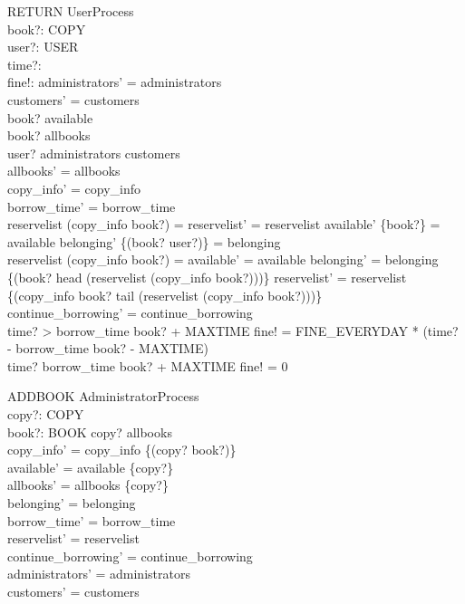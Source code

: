 \begin{schema}{RETURN}
  UserProcess\\
  book?: COPY\\
  user?: USER\\
  time?: \nat \\
  fine!: \nat 
\where
  administrators' = administrators\\
  customers' = customers\\
  book? \notin  available\\
  book? \in  allbooks\\
  user? \in  administrators \cup  customers\\
  allbooks' = allbooks\\
  copy\_info' = copy\_info\\
  borrow\_time' = borrow\_time\\
  reservelist (copy\_info book?) = \langle \rangle  \implies  reservelist' = reservelist \land  available' \cup  \{book?\} = available \land  belonging' \cup  \{(book? \mapsto  user?)\} = belonging\\
  \lnot  reservelist (copy\_info book?) = \langle \rangle  \implies  available' = available \land  belonging' = belonging \oplus  \{(book? \mapsto  head (reservelist (copy\_info book?)))\} \land  reservelist' = reservelist \oplus  \{(copy\_info book? \mapsto  tail (reservelist (copy\_info book?)))\}\\
  continue\_borrowing' = continue\_borrowing\\
  time? > borrow\_time book? + MAXTIME \implies  fine! = FINE\_EVERYDAY * (time? - borrow\_time book? - MAXTIME)\\
  time? \leq  borrow\_time book? + MAXTIME \implies  fine! = 0
\end{schema}

\begin{schema}{ADDBOOK}
  AdministratorProcess\\
  copy?: COPY\\
  book?: BOOK
\where
  copy? \notin  allbooks\\
  copy\_info' = copy\_info \cup  \{(copy? \mapsto  book?)\}\\
  available' = available \cup  \{copy?\}\\
  allbooks' = allbooks \cup  \{copy?\}\\
  belonging' = belonging\\
  borrow\_time' = borrow\_time\\
  reservelist' = reservelist\\
  continue\_borrowing' = continue\_borrowing\\
  administrators' = administrators\\
  customers' = customers
\end{schema}

